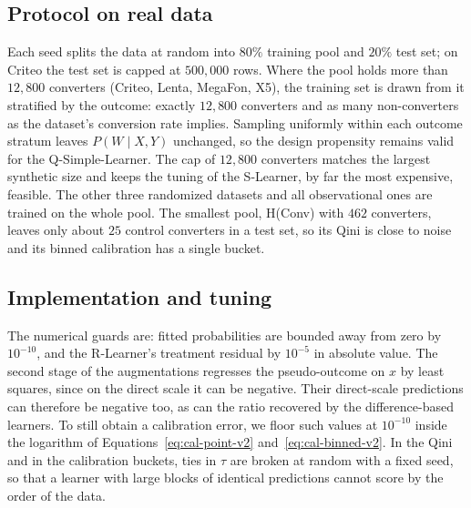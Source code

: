 \documentclass{article}
\begin{document}
\subsection{Protocol on real data}
\label{app:protocol}
Each seed splits the data at random into $80\%$ training pool and $20\%$
test set; on Criteo the test set is capped at $500{,}000$ rows. Where the pool
holds more than $12{,}800$ converters (Criteo, Lenta, MegaFon, X5), the
training set is drawn from it stratified by the outcome: exactly $12{,}800$
converters and as many non-converters as the dataset's conversion rate
implies. Sampling uniformly within each outcome stratum leaves $P(W \mid X, Y)$
unchanged, so the design propensity remains valid for the Q-Simple-Learner.
The cap of $12{,}800$ converters matches the largest synthetic size and keeps
the tuning of the S-Learner, by far the most expensive, feasible. The other
three randomized datasets and all observational ones are trained on the whole
pool. The smallest pool, H(Conv) with $462$ converters, leaves only about $25$
control converters in a test set, so its Qini is close to noise and its
binned calibration has a single bucket.

\subsection{Implementation and tuning}
\label{app:tuning}
The numerical guards are: fitted probabilities are bounded away from zero by
$10^{-10}$, and the R-Learner's treatment residual by $10^{-5}$ in absolute
value. The second stage of the augmentations regresses the pseudo-outcome on
$x$ by least squares, since on the direct scale it can be negative. Their
direct-scale predictions can therefore be negative too, as can the ratio
recovered by the difference-based learners. To still obtain a calibration
error, we floor such values at $10^{-10}$ inside the logarithm of
Equations~\eqref{eq:cal-point-v2} and~\eqref{eq:cal-binned-v2}.
In the Qini and
in the calibration buckets, ties in $\hat\tau$ are broken at random with a
fixed seed, so that a learner with large blocks of identical predictions
cannot score by the order of the data.
\end{document}
